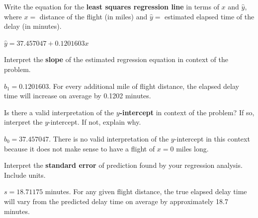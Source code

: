 \documentclass[noanswers]{exam}
\begin{document}
\begin{questions}	
	
	\question Write the equation for the \textbf{least squares regression line} in terms of $x$ and $\hat{y}$, where $x=$ distance of the flight (in miles) and $\hat{y}=$ estimated elapsed time of the delay (in minutes).
		
	\begin{solution}[\stretch{1}]

	\vspace{1mm}
	
	$\hat{y}=37.457047+0.1201603x$
	
	\vspace{1mm}
	
	\end{solution}
	
	\question Interpret the \textbf{slope} of the estimated regression equation in context of the problem.
	
	\begin{solution}[\stretch{1}]
	
	\vspace{1mm}
	
	$b_1=0.1201603$. For every additional mile of flight distance, the elapsed delay time will increase on average by 0.1202 minutes.
	
	\vspace{1mm}	
	
	\end{solution}
	
	\question Is there a valid interpretation of the \textbf{$y$-intercept} in context of the problem? If so, interpret the $y$-intercept. If not, explain why.
	
	\begin{solution}[\stretch{1}]
	
	\vspace{1mm}
	
	$b_0=37.457047$. There is no valid interpretation of the $y$-intercept in this context because it does not make sense to have a flight of $x=0$ miles long.
	
	\vspace{1mm}
	
	\end{solution}
	
	\question Interpret the \textbf{standard error} of prediction found by your regression analysis. Include units.
	
	
	\begin{solution}[\stretch{1}]
	
	\vspace{1mm}
	
	$s=18.71175$ minutes. For any given flight distance, the true elapsed delay time will vary from the predicted delay time on average by approximately 18.7 minutes.
	
	\vspace{1mm}
	
	\end{solution}	
	
\end{questions}
\end{document}

